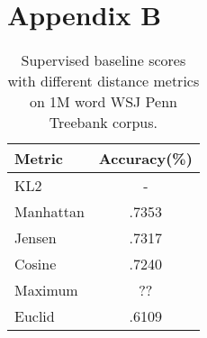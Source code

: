 

\section{Appendix B}
\label{app:dist1M}
\begin{table}[ht] \centering
\caption{Supervised baseline scores with different 
distance metrics on 1M word WSJ Penn Treebank corpus.}
\begin{tabular}{|l|c|}
\hline
Metric & Accuracy(\%) \\
\hline
KL2 & - \\
Manhattan & .7353\\ %
Jensen & .7317 \\ %
Cosine & .7240 \\ %
Maximum & ?? \\
Euclid & .6109 \\ %
\hline
\end{tabular}
\label{tab:distscores1M}
\end{table}
